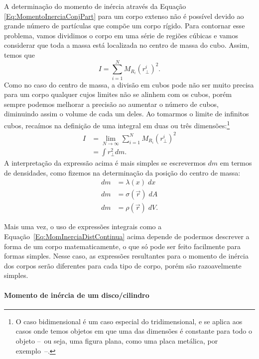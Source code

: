 A determinação do momento de inércia através da Equação \eqref{Eq:MomentoInerciaConjPart} para um corpo extenso não é possível devido ao grande número de partículas que compõe um corpo rígido. Para contornar esse problema, vamos dividimos o corpo em uma série de regiões cúbicas e vamos considerar que toda a massa está localizada no centro de massa do cubo. Assim, temos que
\begin{equation}
    I = \sum_{i = 1}^N M_{R_i} (r_\perp^i)^2.
\end{equation}
%
Como no caso do centro de massa, a divisão em cubos pode não ser muito precisa para um corpo qualquer cujos limites não se alinhem com os cubos, porém sempre podemos melhorar a precisão ao aumentar o número de cubos, diminuindo assim o volume de cada um deles. Ao tomarmos o limite de infinitos cubos, recaímos na definição de uma integral em duas ou três dimensões:\footnote[][3cm]{O caso bidimensional é um caso especial do tridimensional, e se aplica aos casos onde temos objetos em que uma das dimensões é constante para todo o objeto --~ou seja, uma figura plana, como uma placa metálica, por exemplo~--.}
\begin{align}
    I &= \lim_{N \to \infty} \sum_{i = 1}^N M_{R_i} (r_\perp^i)^2 \\
    &= \int r_\perp^2 dm. \label{Eq:MomInerciaDistContinua}
\end{align}
%
A interpretação da expressão acima é mais simples se escrevermos $dm$ em termos de densidades, como fizemos na determinação da posição do centro de massa:
\begin{align}
    dm &= \lambda(x) \; dx \\
    dm &= \sigma(\vec{r}) \;dA \\
    dm &= \rho(\vec{r}) \; dV. \label{Eq:DiferencialDeMassaVolume}
\end{align}

Mais uma vez, o uso de expressões integrais como a Equação~\eqref{Eq:MomInerciaDistContinua} acima depende de podermos descrever a forma de um corpo matematicamente, o que só pode ser feito facilmente para formas simples. Nesse caso, as expressões resultantes para o momento de inércia dos corpos serão diferentes para cada tipo de corpo, porém são razoavelmente simples.

\paragraph{Momento de inércia de um disco/cilindro}


